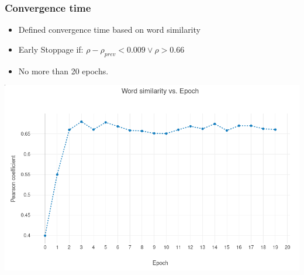 \begin{frame}
\frametitle{Convergence time}
\begin{itemize}
\item Defined convergence time based on word similarity
\item Early Stoppage if: $ \rho -  \rho_{prev} < 0.009 \vee \rho > 0.66$ 
\item No more than 20 epochs. 
\end{itemize}
\includegraphics[scale=0.3]{images/wordsim_convergence}
\end{frame}
